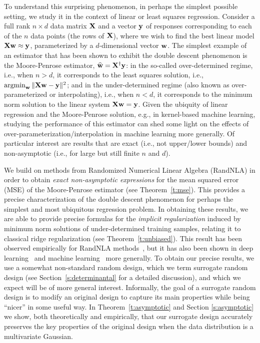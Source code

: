 \documentclass[11pt]{article}
\begin{document}
To understand this
surprising phenomenon, in perhaps the simplest possible setting, we
study it in the context of linear or least squares regression.
Consider a full rank $n\times d$ data matrix $\mathbf X$ and a vector $\mathbf y$ of
responses corresponding to each of the $n$ data points (the rows of $\mathbf X$), where we wish to
find the best linear model $\mathbf X\mathbf w\approx \mathbf y$, parameterized by a
$d$-dimensional vector $\mathbf w$.
The simplest example of an estimator that has been shown to exhibit
the double descent phenomenon \cite{belkin2019two} is the
Moore-Penrose estimator, $\widehat{\mathbf w}=\mathbf X^\dagger\mathbf y$: 
in the so-called over-determined regime, i.e., when $n>d$, it corresponds to the
least squares solution, i.e., $\operatorname*{\mathop{\mathrm{argmin}}}_{\mathbf w} \|\mathbf X\mathbf w-\mathbf y\|^2$; and in the
under-determined regime (also known as
over-parameterized or interpolating), i.e., when $n<d$, it
corresponds to the minimum norm solution to the linear system $\mathbf X\mathbf w=\mathbf y$.  
Given the ubiquity of linear regression and the Moore-Penrose
solution, e.g., in kernel-based machine learning, studying the
performance of this estimator can shed some light on the effects of
over-parameterization/interpolation in machine learning more generally. 
Of particular interest are results that are exact (i.e., not upper/lower bounds) and
non-asymptotic (i.e., for large but still finite $n$ and $d$).  

We build on methods from Randomized Numerical
Linear Algebra (RandNLA) in order to obtain \emph{exact non-asymptotic
expressions} for the mean squared error (MSE) of the
Moore-Penrose estimator (see Theorem~\ref{t:mse}). 
This provides a precise characterization of the double descent
phenomenon for perhaps the simplest and most ubiquitous regression
problem. 
In obtaining these results, we are able to provide precise
formulas for the \emph{implicit regularization} induced by
minimum norm solutions of
under-determined training samples, relating it to classical ridge regularization (see Theorem~\ref{t:unbiased}). 
This result has been observed empirically for RandNLA
methods~\cite{Mah-mat-rev_JRNL}, but it has also been shown 
in deep learning~\cite{Ney17_TR} and machine
learning~\cite{Mah12} more generally. 
To obtain our precise results, we use a somewhat non-standard random
design, which we term surrogate random design (see
Section~\ref{s:determinantal} for a detailed discussion), and which we
expect will be of more general interest. 
Informally, the goal of a surrogate random design is to modify an
original design to capture its main properties
while being ``nicer'' in some useful way. In
Theorem~\ref{t:asymptotic} and Section \ref{s:asymptotic} we show,
both theoretically and empirically, that our surrogate design
accurately preserves the key properties of the original design when
the data distribution is a multivariate Gaussian.
\end{document}
